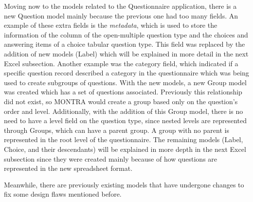 Moving now to the models related to the Questionnaire application, there is a new Question model mainly because the previous one had too many fields.
An example of these extra fields is the \textit{metadata}, which is used to store the information of the column of the open-multiple question type and the choices and answering items of a choice tabular question type.
This field was replaced by the addition of new models (Label) which will be explained in more detail in the next Excel subsection.
Another example was the category field, which indicated if a specific question record described a category in the questionnaire which was being used to create subgroups of questions.
With the new models, a new Group model was created which has a set of questions associated.
Previously this relationship did not exist, so MONTRA would create a group based only on the question's order and level.
Additionally, with the addition of this Group model, there is no need to have a level field on the question type, since nested levels are represented through Groups, which can have a parent group.
A group with no parent is represented in the root level of the questionnaire.
The remaining models (Label, Choice, and their descendants) will be explained in more depth in the next Excel subsection since they were created mainly because of how questions are represented in the new spreadsheet format.

Meanwhile, there are previously existing models that have undergone changes to fix some design flaws mentioned before.

